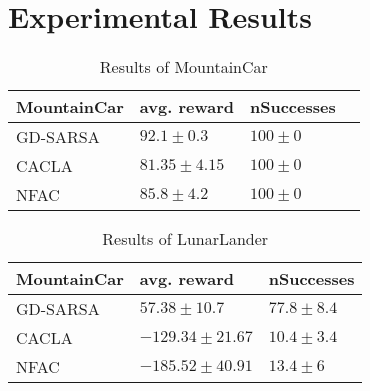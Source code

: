 \section{Experimental Results}

\begin{table}[]
\centering
\caption{Results of MountainCar}
\label{MC_results}
\begin{tabular}{|l|l|l|l|}
\cline{1-3}
MountainCar & avg. reward & nSuccesses  \\ \hline
GD-SARSA    &  $92.1 \pm 0.3$                    &        $100 \pm 0$                        \\ \hline
CACLA       &       $81.35 \pm 4.15$                           &          $100 \pm 0$                   \\ \hline
NFAC        &           $85.8 \pm 4.2$                       &          $100 \pm 0$                    \\ \hline
\end{tabular}
\end{table}

\begin{table}[]
\centering
\caption{Results of LunarLander}
\label{LL_results}
\begin{tabular}{|l|l|l|}
\cline{1-3}
MountainCar & avg. reward & nSuccesses  \\ \hline
GD-SARSA    &  $57.38 \pm 10.7$                    &        $77.8 \pm 8.4$                          \\ \hline
CACLA       &       $-129.34 \pm 21.67$                           &          $10.4 \pm 3.4$                         \\ \hline
NFAC        &           $-185.52 \pm 40.91$                       &          $13.4 \pm 6$                    \\ \hline
\end{tabular}
\end{table}
